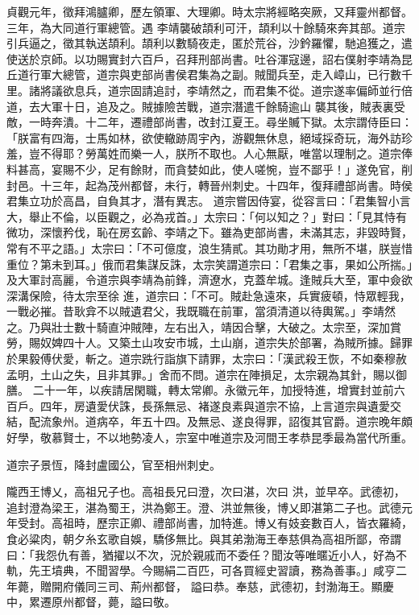 \begin{pinyinscope}
 貞觀元年，徵拜鴻臚卿，歷左領軍、大理卿。時太宗將經略突厥，又拜靈州都督。三年，為大同道行軍總管。遇
 李靖襲破頡利可汗，頡利以十餘騎來奔其部。道宗引兵逼之，徵其執送頡利。頡利以數騎夜走，匿於荒谷，沙鈐羅懼，馳追獲之，遣使送於京師。以功賜實封六百戶，召拜刑部尚書。吐谷渾寇邊，詔右僕射李靖為昆丘道行軍大總管，道宗與吏部尚書侯君集為之副。賊聞兵至，走入嶂山，已行數千里。諸將議欲息兵，道宗固請追討，李靖然之，而君集不從。道宗遂率偏師並行倍道，去大軍十日，追及之。賊據險苦戰，道宗潛遣千餘騎逾山
 襲其後，賊表裏受敵，一時奔潰。十二年，遷禮部尚書，改封江夏王。尋坐贓下獄。太宗謂侍臣曰：「朕富有四海，士馬如林，欲使轍跡周宇內，游觀無休息，絕域採奇玩，海外訪珍羞，豈不得耶？勞萬姓而樂一人，朕所不取也。人心無厭，唯當以理制之。道宗俸料甚高，宴賜不少，足有餘財，而貪婪如此，使人嗟惋，豈不鄙乎！」遂免官，削封邑。十三年，起為茂州都督，未行，轉晉州刺史。十四年，復拜禮部尚書。時侯君集立功於高昌，自負其才，潛有異志。
 道宗嘗因侍宴，從容言曰：「君集智小言大，舉止不倫，以臣觀之，必為戎首。」太宗曰：「何以知之？」對曰：「見其恃有微功，深懷矜伐，恥在房玄齡、李靖之下。雖為吏部尚書，未滿其志，非毀時賢，常有不平之語。」太宗曰：「不可億度，浪生猜貳。其功勛才用，無所不堪，朕豈惜重位？第未到耳。」俄而君集謀反誅，太宗笑謂道宗曰：「君集之事，果如公所揣。」及大軍討高麗，令道宗與李靖為前鋒，濟遼水，克蓋牟城。逢賊兵大至，軍中僉欲深溝保險，待太宗至徐
 進，道宗曰：「不可。賊赴急遠來，兵實疲頓，恃眾輕我，一戰必摧。昔耿弇不以賊遺君父，我既職在前軍，當須清道以待輿駕。」李靖然之。乃與壯士數十騎直沖賊陣，左右出入，靖因合擊，大破之。太宗至，深加賞勞，賜奴婢四十人。又築土山攻安市城，土山崩，道宗失於部署，為賊所據。歸罪於果毅傅伏愛，斬之。道宗跣行詣旗下請罪，太宗曰：「漢武殺王恢，不如秦穆赦孟明，土山之失，且非其罪。」舍而不問。道宗在陣損足，太宗親為其針，賜以御膳。
 二十一年，以疾請居閑職，轉太常卿。永徽元年，加授特進，增實封並前六百戶。四年，房遺愛伏誅，長孫無忌、褚遂良素與道宗不協，上言道宗與遺愛交結，配流象州。道病卒，年五十四。及無忌、遂良得罪，詔復其官爵。道宗晚年頗好學，敬慕賢士，不以地勢凌人，宗室中唯道宗及河間王孝恭昆季最為當代所重。



 道宗子景恆，降封盧國公，官至相州刺史。



 隴西王博乂，高祖兄子也。高祖長兄曰澄，次曰湛，次曰
 洪，並早卒。武德初，追封澄為梁王，湛為蜀王，洪為鄭王。澄、洪並無後，博乂即湛第二子也。武德元年受封。高祖時，歷宗正卿、禮部尚書，加特進。博乂有妓妾數百人，皆衣羅綺，食必粱肉，朝夕糸玄歌自娛，驕侈無比。與其弟渤海王奉慈俱為高祖所鄙，帝謂曰：「我怨仇有善，猶擢以不次，況於親戚而不委任？聞汝等唯暱近小人，好為不軌，先王墳典，不聞習學。今賜絹二百匹，可各買經史習讀，務為善事。」咸亨二年薨，贈開府儀同三司、荊州都督，
 謚曰恭。奉慈，武德初，封渤海王。顯慶中，累遷原州都督，薨，謚曰敬。




\end{pinyinscope}
